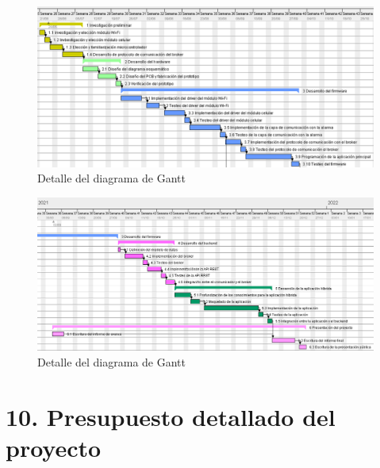 \documentclass[
11pt, %
]{charter}
\begin{document}
\begin{figure}[htpb]
\centering 
\includegraphics[width=\textwidth]{./Figuras/gantt2.png}
\caption{Detalle del diagrama de Gantt}
\label{fig:gantt2}
\end{figure}

\begin{figure}[htpb]
\centering 
\includegraphics[width=\textwidth]{./Figuras/gantt3.png}
\caption{Detalle del diagrama de Gantt}
\label{fig:gantt3}
\end{figure}



\section{10. Presupuesto detallado del proyecto}
\label{sec:presupuesto}



\end{document}
